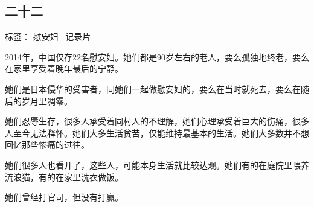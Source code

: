 \subsection{二十二}

标签： 慰安妇 \  记录片

2014年，中国仅存22名慰安妇。她们都是90岁左右的老人，要么孤独地终老，要么在家里享受着晚年最后的宁静。

她们是日本侵华的受害者，同她们一起做慰安妇的，要么在当时就死去，要么在随后的岁月里凋零。

她们忍辱生存，很多人承受着同村人的不理解，她们心理承受着巨大的伤痛，很多人至今无法释怀。她们大多生活贫苦，仅能维持最基本的生活。她们大多数并不想回忆那些惨痛的过往。

她们很多人也看开了，这些人，可能本身生活就比较达观。她们有的在庭院里喂养流浪猫，有的在家里洗衣做饭。

她们曾经打官司，但没有打赢。
